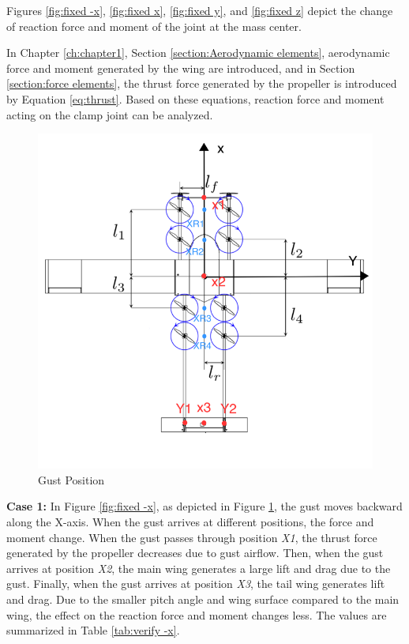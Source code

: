 Figures \ref{fig:fixed -x}, \ref{fig:fixed x}, \ref{fig:fixed y}, and \ref{fig:fixed z} depict the change of reaction force and moment of the joint at the mass center.

In Chapter \ref{ch:chapter1}, Section \ref{section:Aerodynamic elements}, aerodynamic force and moment generated by the wing are introduced, and in Section \ref{section:force elements}, the thrust force generated by the propeller is introduced by Equation \ref{eq:thrust}. Based on these equations, reaction force and moment acting on the clamp joint can be analyzed.

\begin{figure}[htbp]
    \centering
    \includegraphics[width=0.75\linewidth]{Images/Gust_Position.png}
    \caption{Gust Position}
    \label{fig:Gust position}
\end{figure}

\textbf{Case 1:} In Figure \ref{fig:fixed -x}, as depicted in Figure \ref{fig:Gust position}, the gust moves backward along the X-axis. When the gust arrives at different positions, the force and moment change. When the gust passes through position \textit{X1}, the thrust force generated by the propeller decreases due to gust airflow. Then, when the gust arrives at position \textit{X2}, the main wing generates a large lift and drag due to the gust. Finally, when the gust arrives at position \textit{X3}, the tail wing generates lift and drag. Due to the smaller pitch angle and wing surface compared to the main wing, the effect on the reaction force and moment changes less. The values are summarized in Table \ref{tab:verify -x}.

